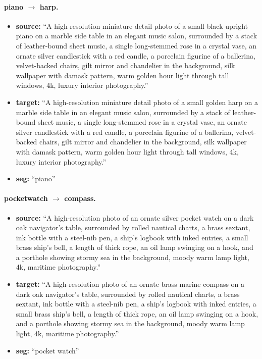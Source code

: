 \paragraph{piano $\to$ harp.}
\begin{itemize}
    \item \textbf{source:} ``A high-resolution miniature detail photo of a small black upright piano on a marble side table in an elegant music salon, surrounded by a stack of leather-bound sheet music, a single long-stemmed rose in a crystal vase, an ornate silver candlestick with a red candle, a porcelain figurine of a ballerina, velvet-backed chairs, gilt mirror and chandelier in the background, silk wallpaper with damask pattern, warm golden hour light through tall windows, 4k, luxury interior photography.''
    \item \textbf{target:} ``A high-resolution miniature detail photo of a small golden harp on a marble side table in an elegant music salon, surrounded by a stack of leather-bound sheet music, a single long-stemmed rose in a crystal vase, an ornate silver candlestick with a red candle, a porcelain figurine of a ballerina, velvet-backed chairs, gilt mirror and chandelier in the background, silk wallpaper with damask pattern, warm golden hour light through tall windows, 4k, luxury interior photography.''
    \item \textbf{seg:} ``piano''
\end{itemize}

\paragraph{pocketwatch $\to$ compass.}
\begin{itemize}
    \item \textbf{source:} ``A high-resolution photo of an ornate silver pocket watch on a dark oak navigator's table, surrounded by rolled nautical charts, a brass sextant, ink bottle with a steel-nib pen, a ship's logbook with inked entries, a small brass ship's bell, a length of thick rope, an oil lamp swinging on a hook, and a porthole showing stormy sea in the background, moody warm lamp light, 4k, maritime photography.''
    \item \textbf{target:} ``A high-resolution photo of an ornate brass marine compass on a dark oak navigator's table, surrounded by rolled nautical charts, a brass sextant, ink bottle with a steel-nib pen, a ship's logbook with inked entries, a small brass ship's bell, a length of thick rope, an oil lamp swinging on a hook, and a porthole showing stormy sea in the background, moody warm lamp light, 4k, maritime photography.''
    \item \textbf{seg:} ``pocket watch''
\end{itemize}

